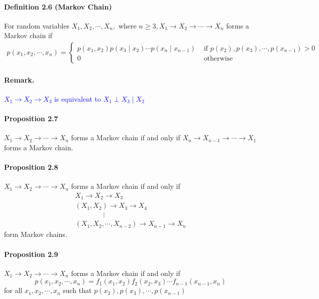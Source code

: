 \documentclass[8pt]{article}
\begin{document}
\begin{tcolorbox}
\paragraph{Definition 2.6 (Markov Chain)} For random variables $X_{1}, X_{2}, \cdots, X_{n},$ where $n \geq 3, X_{1} \rightarrow X_{2} \rightarrow \cdots \rightarrow X_{n}$ forms a Markov chain if
$$
\begin{array}{l}
p\left(x_{1}, x_{2}, \cdots, x_{n}\right)= 
\left\{\begin{array}{ll}
p\left(x_{1}, x_{2}\right) p\left(x_{3} \mid x_{2}\right) \cdots p\left(x_{n} \mid x_{n-1}\right) & \text { if } p\left(x_{2}\right), p\left(x_{3}\right), \cdots, p\left(x_{n-1}\right)>0 \\
0 & \text { otherwise }
\end{array}\right.
\end{array}
$$
\paragraph{Remark.} \textcolor{blue}{$X_{1} \rightarrow X_{2} \rightarrow X_{3}$ is equivalent to $X_{1} \perp X_{3} \mid X_{2}$}
\\
\paragraph{Proposition 2.7} $X_{1} \rightarrow X_{2} \rightarrow \cdots \rightarrow X_{n}$ forms a Markov chain if and only if 
$X_{n} \rightarrow X_{n-1} \rightarrow \cdots \rightarrow X_{1}$ forms a Markov chain.
\\
\paragraph{Proposition 2.8} $X_{1} \rightarrow X_{2} \rightarrow \cdots \rightarrow X_{n}$ forms a Markov chain if and only if
$$
\begin{array}{l}
X_{1} \rightarrow X_{2} \rightarrow X_{3} \\
\left(X_{1}, X_{2}\right) \rightarrow X_{3} \rightarrow X_{4} \\
\qquad \qquad \vdots \\
\left(X_{1}, X_{2}, \cdots, X_{n-2}\right) \rightarrow X_{n-1} \rightarrow X_{n}
\end{array}
$$
form Markov chains.
\\
\paragraph{Proposition 2.9} $X_{1} \rightarrow X_{2} \rightarrow \cdots \rightarrow X_{n}$ forms a Markov chain if and only if
$$
p\left(x_{1}, x_{2}, \cdots, x_{n}\right)=f_{1}\left(x_{1}, x_{2}\right) f_{2}\left(x_{2}, x_{3}\right) \cdots f_{n-1}\left(x_{n-1}, x_{n}\right)
$$
for all $x_{1}, x_{2}, \cdots, x_{n}$ such that $p\left(x_{2}\right), p\left(x_{3}\right), \cdots, p\left(x_{n-1}\right)$
\\

\end{tcolorbox}
\end{document}
